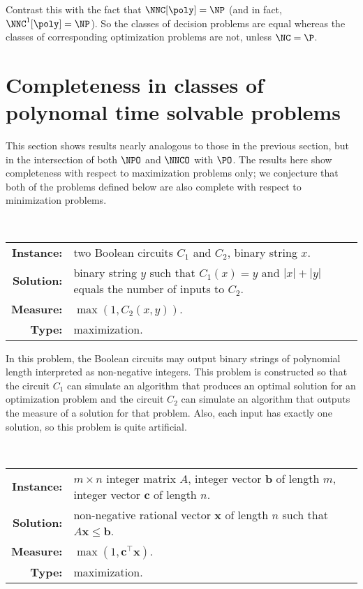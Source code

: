 Contrast this with the fact that $\NNC[\poly] = \NP$ \autocite[Theorem~2.2]{wolf94} (and in fact, $\NNC^1[\poly] = \NP$).
So the classes of decision problems are equal whereas the classes of corresponding optimization problems are not, unless $\NC = \P$.

\section{Completeness in classes of polynomal time solvable problems}
\label{sec:nncopocomplete}

This section shows results nearly analogous to those in the previous section, but in the intersection of both $\NPO$ and $\NNCO$ with $\PO$.
The results here show completeness with respect to maximization problems only; we conjecture that both of the problems defined below are also complete with respect to minimization problems.

\begin{definition}
  \mbox{} \\
  \begin{tabular}{r p{9.5cm}}
    \textbf{Instance:} & two Boolean circuits $C_1$ and $C_2$, binary string $x$. \\
    \textbf{Solution:} & binary string $y$ such that $C_1(x) = y$ and $|x| + |y|$ equals the number of inputs to $C_2$. \\
    \textbf{Measure:} & $\max(1, C_2(x, y))$. \\
    \textbf{Type:} & maximization.
  \end{tabular}
\end{definition}

In this problem, the Boolean circuits may output binary strings of polynomial length interpreted as non-negative integers.
This problem is constructed so that the circuit $C_1$ can simulate an algorithm that produces an optimal solution for an optimization problem and the circuit $C_2$ can simulate an algorithm that outputs the measure of a solution for that problem.
Also, each input has exactly one solution, so this problem is quite artificial.

\begin{definition}
  \mbox{} \\
  \begin{tabular}{r p{9.5cm}}
    \textbf{Instance:} & $m \times n$ integer matrix $A$, integer vector $\mathbf{b}$ of length $m$, integer vector $\mathbf{c}$ of length $n$. \\
    \textbf{Solution:} & non-negative rational vector $\mathbf{x}$ of length $n$ such that $A \mathbf{x} \leq \mathbf{b}$. \\
    \textbf{Measure:} & $\max(1, \mathbf{c}^\intercal \mathbf{x})$. \\
    \textbf{Type:} & maximization.
  \end{tabular}
\end{definition}

